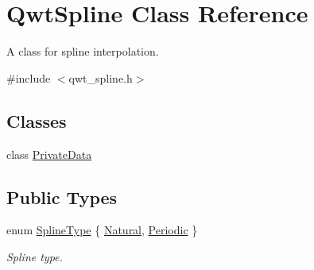 \hypertarget{class_qwt_spline}{\section{Qwt\-Spline Class Reference}
\label{class_qwt_spline}
}


A class for spline interpolation.  




{\ttfamily \#include $<$qwt\-\_\-spline.\-h$>$}

\subsection*{Classes}
\begin{DoxyCompactItemize}
\item 
class \hyperlink{class_qwt_spline_1_1_private_data}{Private\-Data}
\end{DoxyCompactItemize}
\subsection*{Public Types}
\begin{DoxyCompactItemize}
\item 
enum \hyperlink{class_qwt_spline_a2bd2bda128f82acd596348eb8d64231c}{Spline\-Type} \{ \hyperlink{class_qwt_spline_a2bd2bda128f82acd596348eb8d64231ca506b78ec81ab6d56a4bbce891490c857}{Natural}, 
\hyperlink{class_qwt_spline_a2bd2bda128f82acd596348eb8d64231ca500c12cdbdef35c62e9fab86c5727acb}{Periodic}
 \}
\begin{DoxyCompactList}\small\item\em Spline type. \end{DoxyCompactList}\end{DoxyCompactItemize}
